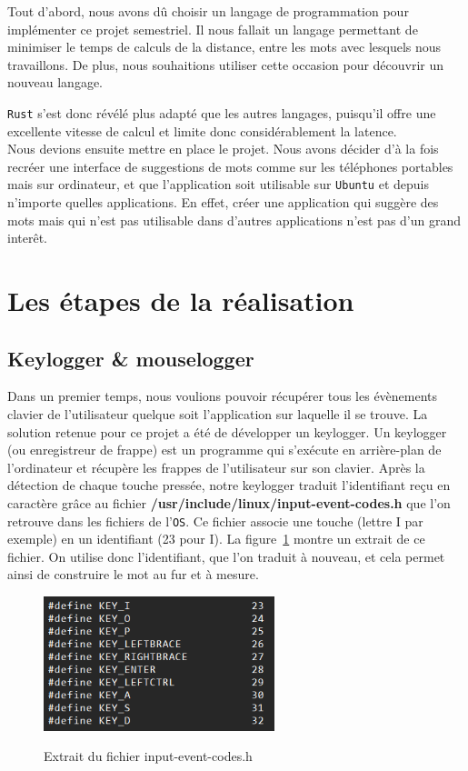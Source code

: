 \documentclass[a4paper, 11pt]{report}
\newcommand{\langage}[1]{\texttt{#1}}
\begin{document}
Tout d'abord, nous avons dû choisir un langage de programmation pour implémenter ce projet semestriel. Il nous fallait un langage permettant de minimiser le temps de calculs de la distance, entre les mots avec lesquels nous travaillons. De plus, nous souhaitions utiliser cette occasion pour découvrir un nouveau langage.~{\langage{Rust} s’est donc révélé plus adapté que les autres langages, puisqu’il offre une excellente vitesse de calcul et limite donc considérablement la latence.\\

Nous devions ensuite mettre en place le projet. Nous avons décider d'à la fois recréer une interface de suggestions de mots comme sur les téléphones portables mais sur ordinateur, et que l'application soit utilisable sur \langage{Ubuntu} et depuis n'importe quelles applications. En effet, créer une application qui suggère des mots mais qui n'est pas utilisable dans d'autres applications n'est pas d'un grand interêt.

\section{Les étapes de la réalisation}

\subsection{Keylogger \& mouselogger}

Dans un premier temps, nous voulions pouvoir récupérer tous les évènements clavier de l'utilisateur quelque soit l'application sur laquelle il se trouve. La solution retenue pour ce projet a été de développer un keylogger. Un keylogger (ou enregistreur de frappe) est un programme qui s’exécute en arrière-plan de l'ordinateur et récupère les frappes de l’utilisateur sur son clavier. Après la détection de chaque touche pressée, notre keylogger traduit l'identifiant reçu en caractère grâce au fichier \textbf{/usr/include/linux/input-event-codes.h} que l'on retrouve dans les fichiers de l'\langage{OS}. Ce fichier associe une touche (lettre I par exemple) en un identifiant (23 pour I). La figure~\ref{fig:lecture_touche} montre un extrait de ce fichier. On utilise donc l'identifiant, que l'on traduit à nouveau, et cela permet ainsi de construire le mot au fur et à mesure. \\

\begin{figure}[H]
	\begin{center}
		{\includegraphics[width=0.6\textwidth]{images/fichier_touche.png}}
	\end{center}
	\caption{Extrait du fichier input-event-codes.h}
	\label{fig:lecture_touche}
\end{figure}

}
\end{document}
